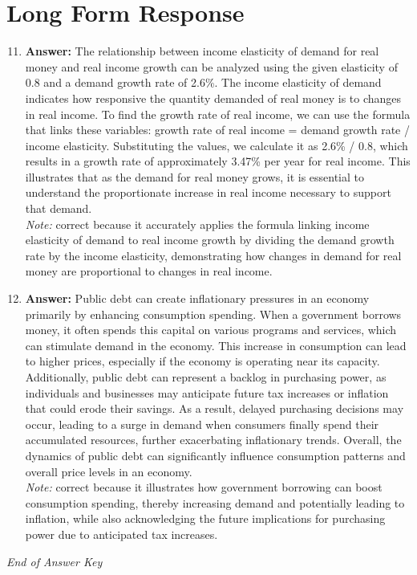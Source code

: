 \documentclass[12pt]{article}
\begin{document}
\section*{Long Form Response}
\begin{enumerate}[label=\arabic*.]
\setcounter{enumi}{10}
\item \textbf{Answer:} The relationship between income elasticity of demand for real money and real income growth can be analyzed using the given elasticity of 0.8 and a demand growth rate of 2.6\%. The income elasticity of demand indicates how responsive the quantity demanded of real money is to changes in real income. To find the growth rate of real income, we can use the formula that links these variables: growth rate of real income = demand growth rate / income elasticity. Substituting the values, we calculate it as 2.6\% / 0.8, which results in a growth rate of approximately 3.47\% per year for real income. This illustrates that as the demand for real money grows, it is essential to understand the proportionate increase in real income necessary to support that demand.
\\ \textit{Note:} correct because it accurately applies the formula linking income elasticity of demand to real income growth by dividing the demand growth rate by the income elasticity, demonstrating how changes in demand for real money are proportional to changes in real income.
\item \textbf{Answer:} Public debt can create inflationary pressures in an economy primarily by enhancing consumption spending. When a government borrows money, it often spends this capital on various programs and services, which can stimulate demand in the economy. This increase in consumption can lead to higher prices, especially if the economy is operating near its capacity. Additionally, public debt can represent a backlog in purchasing power, as individuals and businesses may anticipate future tax increases or inflation that could erode their savings. As a result, delayed purchasing decisions may occur, leading to a surge in demand when consumers finally spend their accumulated resources, further exacerbating inflationary trends. Overall, the dynamics of public debt can significantly influence consumption patterns and overall price levels in an economy.
\\ \textit{Note:} correct because it illustrates how government borrowing can boost consumption spending, thereby increasing demand and potentially leading to inflation, while also acknowledging the future implications for purchasing power due to anticipated tax increases.
\end{enumerate}

\vfill
\noindent\textit{End of Answer Key}
\end{document}
